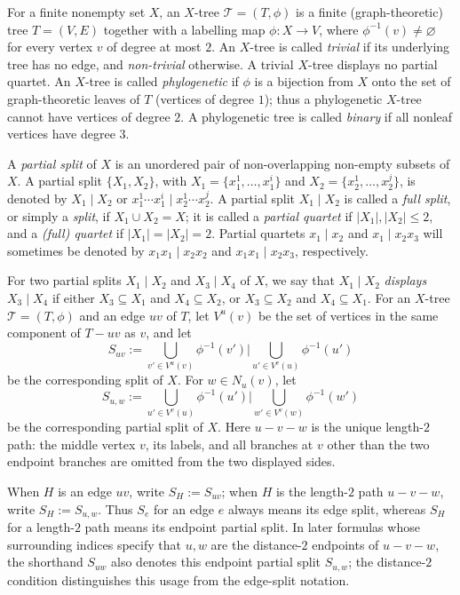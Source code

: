\documentclass[pdflatex,sn-mathphys-num]{sn-jnl}
\theoremstyle{thmstyleone}
\begin{document}
For a finite nonempty set $X$, an $X$-tree $\mathcal T=(T,\phi)$ is a finite
(graph-theoretic) tree $T=(V,E)$ together with a labelling map
$\phi:X\to V$, where $\phi^{-1}(v)\ne\varnothing$ for every vertex $v$
of degree at most $2$.  An $X$-tree is called \emph{trivial} if its underlying
tree has no edge, and \emph{non-trivial} otherwise.  A trivial $X$-tree
displays no partial quartet.  An $X$-tree is called \emph{phylogenetic} if
$\phi$ is a bijection from $X$ onto the set of graph-theoretic leaves of
$T$ (vertices of degree $1$); thus a phylogenetic
$X$-tree cannot have vertices of degree $2$.  A phylogenetic tree is
called \emph{binary} if all nonleaf vertices have degree $3$.

A \emph{partial split} of $X$ is an unordered pair of non-overlapping
non-empty subsets of $X$.  A partial split $\{X_1,X_2\}$, with
$X_1=\{x_1^1,\ldots,x_1^i\}$ and
$X_2=\{x_2^1,\ldots,x_2^j\}$, is denoted by $X_1\mid X_2$ or
$x_1^1\cdots x_1^i\mid x_2^1\cdots x_2^j$.  A partial split
$X_1\mid X_2$ is called a \emph{full split}, or simply a \emph{split},
if $X_1\cup X_2=X$; it is called a \emph{partial quartet} if
$|X_1|,|X_2|\le2$, and a \emph{(full) quartet} if
$|X_1|=|X_2|=2$.  Partial quartets $x_1\mid x_2$ and
$x_1\mid x_2x_3$ will sometimes be denoted by
$x_1x_1\mid x_2x_2$ and $x_1x_1\mid x_2x_3$, respectively.

For two partial splits $X_1\mid X_2$ and $X_3\mid X_4$ of $X$, we say
that $X_1\mid X_2$ \emph{displays} $X_3\mid X_4$ if either
$X_3\subseteq X_1$ and $X_4\subseteq X_2$, or $X_3\subseteq X_2$ and
$X_4\subseteq X_1$.  For an $X$-tree $\mathcal T=(T,\phi)$ and an edge
$uv$ of $T$, let $V^u(v)$ be the set of vertices in the same component
of $T-uv$ as $v$, and let
\[
 S_{uv}:=\bigcup_{v'\in V^u(v)}\phi^{-1}(v')
 \mathbin{\Big|}
 \bigcup_{u'\in V^v(u)}\phi^{-1}(u')
\]
be the corresponding split of $X$.  For $w\in N_u(v)$, let
\[
 S_{u,w}:=\bigcup_{u'\in V^v(u)}\phi^{-1}(u')
 \mathbin{\Big|}
\bigcup_{w'\in V^v(w)}\phi^{-1}(w')
\]
be the corresponding partial split of $X$.
Here $u-v-w$ is the unique length-$2$ path: the middle vertex $v$, its
labels, and all branches at $v$ other than the two endpoint branches are
omitted from the two displayed sides.

When $H$ is an edge $uv$, write $S_H:=S_{uv}$; when $H$ is the
length-$2$ path $u-v-w$, write $S_H:=S_{u,w}$.  Thus $S_e$ for an edge
$e$ always means its edge split, whereas $S_H$ for a length-$2$ path means
its endpoint partial split.  In later formulas whose surrounding indices
specify that $u,w$ are the distance-$2$ endpoints of $u-v-w$, the shorthand
$S_{uw}$ also denotes this endpoint partial split $S_{u,w}$; the
distance-$2$ condition distinguishes this usage from the edge-split notation.
\end{document}
